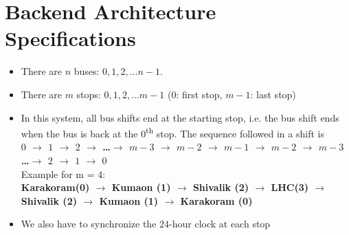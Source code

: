 \section{Backend Architecture Specifications}

\begin{itemize}
    \item There are $n$ buses: $0, 1, 2, \ldots n-1$.
    \item There are $m$ stops: $0, 1, 2, \ldots m-1$  ($0$: first stop, $m-1$: last stop)
    \item In this system, all bus shifts end at the starting stop, i.e. the bus shift ends when the bus is back at the $0$\textsuperscript{th} stop. The sequence followed in a shift is \\
    {\bfseries $0$ $\to$ $1$ $\to$ $2$ $\to$ \ldots $\to$ $m-3$ $\to$ $m-2$ $\to$ $m-1$ $\to$ $m-2$ $\to$ $m-3$ \ldots$\to$ $2$ $\to$ $1$ $\to$ $0$}\\
    Example for m = 4: \\
    {\bfseries Karakoram(0) $\to$ Kumaon (1) $\to$ Shivalik (2) $\to$ LHC(3) $\to$ Shivalik (2) $\to$ Kumaon (1) $\to$ Karakoram (0)}
    \item We also have to synchronize the $24$-hour clock at each stop
\end{itemize}

    
    